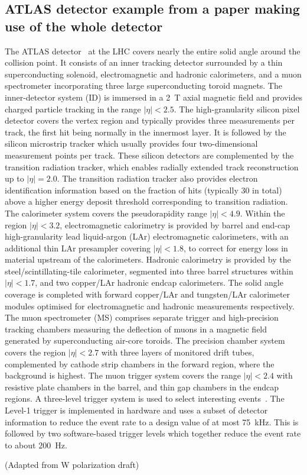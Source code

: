 \subsection{ATLAS detector example from a paper making use of the whole detector}
\label{sec:atlas2}

The ATLAS detector~\cite{atlas-detector} at the LHC covers nearly the entire solid angle around the collision point.
It consists of an inner tracking detector surrounded by a thin superconducting solenoid, electromagnetic and hadronic calorimeters, and a muon spectrometer incorporating three large superconducting toroid magnets.
The inner-detector system (ID) is immersed in a \SI{2}{\tesla} axial magnetic field 
and provides charged particle tracking in the range $|\eta| < 2.5$. 
The high-granularity silicon pixel detector covers the vertex region and typically provides three measurements per track, 
the first hit being normally in the innermost layer.
It is followed by the silicon microstrip tracker which usually provides four two-dimensional measurement points per track.
These silicon detectors are complemented by the transition radiation tracker,
which enables radially extended track reconstruction up to $|\eta| = 2.0$. 
The transition radiation tracker also provides electron identification information 
based on the fraction of hits (typically 30 in total) above a higher energy deposit threshold corresponding to transition radiation.
The calorimeter system covers the pseudorapidity range $|\eta|< 4.9$.
Within the region $|\eta|< 3.2$, electromagnetic calorimetry is provided by barrel and 
end-cap high-granularity lead liquid-argon (LAr) electromagnetic calorimeters,
with an additional thin LAr presampler covering $|\eta| < 1.8$,
to correct for energy loss in material upstream of the calorimeters.
Hadronic calorimetry is provided by the steel/scintillating-tile calorimeter,
segmented into three barrel structures within $|\eta| < 1.7$, and two copper/LAr hadronic endcap calorimeters.
The solid angle coverage is completed with forward copper/LAr and tungsten/LAr calorimeter modules
optimised for electromagnetic and hadronic measurements respectively.
The muon spectrometer (MS) comprises separate trigger and
high-precision tracking chambers measuring the deflection of muons in a magnetic field generated by superconducting air-core toroids.
The precision chamber system covers the region $|\eta| < 2.7$ with three layers of monitored drift tubes,
complemented by cathode strip chambers in the forward region, where the background is highest.
The muon trigger system covers the range $|\eta| < 2.4$ with resistive plate chambers in the barrel, and thin gap chambers in the endcap regions.
A three-level trigger system is used to select interesting events~\cite{Aad2011xs}.
The Level-1 trigger is implemented in hardware and uses a subset of detector information
to reduce the event rate to a design value of at most \SI{75}{\kHz}.
This is followed by two software-based trigger levels which together reduce the event rate to about 200~Hz.

(Adapted from W polarization draft)

